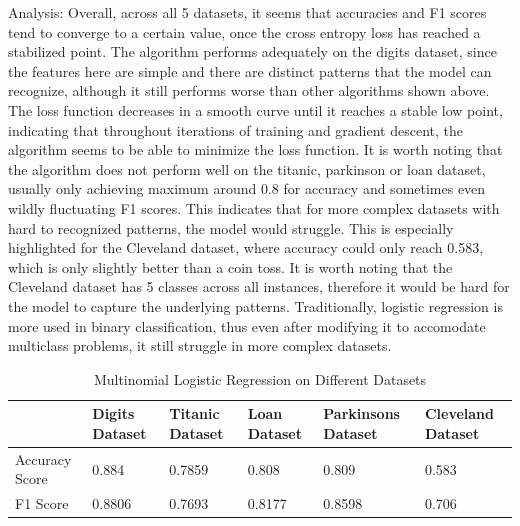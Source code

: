 \documentclass[letterpaper]{article}
\begin{document}
Analysis: Overall, across all 5 datasets, it seems that accuracies and F1 scores tend to converge to a certain value, once the cross entropy loss has reached a stabilized point. 
The algorithm performs adequately on the digits dataset, since the features here are simple and there are distinct patterns that the model can recognize, although it still performs worse than other algorithms shown above. 
The loss function decreases in a smooth curve until it reaches a stable low point, indicating that throughout iterations of training and gradient descent, the algorithm seems to be able to minimize the loss function. 
It is worth noting that the algorithm does not perform well on the titanic, parkinson or loan dataset, usually only achieving maximum around 0.8 for accuracy and sometimes even wildly fluctuating F1 scores. This indicates that for more complex datasets with hard to recognized patterns, the model would struggle. 
This is especially highlighted for the Cleveland dataset, where accuracy could only reach 0.583, which is only slightly better than a coin toss. 
It is worth noting that the Cleveland dataset has 5 classes across all instances, therefore it would be hard for the model to capture the underlying patterns. Traditionally, logistic regression is more used in binary classification, thus even after modifying it to accomodate multiclass problems, it still struggle in more complex datasets. 
 \begin{table}[H]
	\centering
	\begin{tabular}{|l|l|l|l|l|l|}
		\hline
		               & Digits Dataset & Titanic Dataset & Loan Dataset & Parkinsons Dataset & Cleveland Dataset \\ \hline
		Accuracy Score & 0.884     & 0.7859       & 0.808     & 0.809    &    0.583   \\ \hline
		F1 Score       & 0.8806     & 0.7693        & 0.8177     & 0.8598  &   0.706   \\ \hline
	\end{tabular}
	\caption{Multinomial Logistic Regression on Different Datasets}
\end{table}
\end{document}
